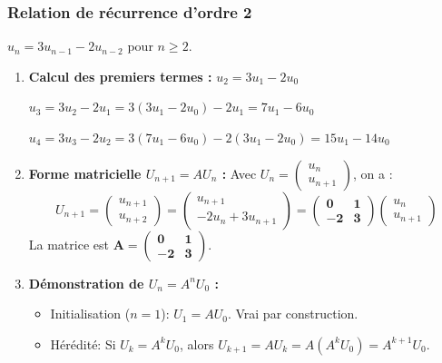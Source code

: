 \documentclass[french]{yLectureNote}
\begin{document}
\subsubsection{Relation de récurrence d'ordre 2}
$u_{n}=3u_{n-1}-2u_{n-2}$ pour $n\ge2$.

\begin{enumerate}
    \item \textbf{Calcul des premiers termes :}
    $u_{2} = 3u_{1} - 2u_{0}$

    $u_{3} = 3u_{2} - 2u_{1} = 3(3u_{1} - 2u_{0}) - 2u_{1} = 7u_{1} - 6u_{0}$

    $u_{4} = 3u_{3} - 2u_{2} = 3(7u_{1} - 6u_{0}) - 2(3u_{1} - 2u_{0}) = 15u_{1} - 14u_{0}$

    \item \textbf{Forme matricielle $U_{n+1}=AU_{n}$ :}
    Avec $U_{n}=\begin{pmatrix}u_{n}\\ u_{n+1}\end{pmatrix}$, on a :
    $$U_{n+1} = \begin{pmatrix} u_{n+1}\\ u_{n+2} \end{pmatrix} = \begin{pmatrix} u_{n+1}\\ -2u_{n}+3u_{n+1} \end{pmatrix} = \mathbf{\begin{pmatrix} 0&1\\ -2&3 \end{pmatrix}} \begin{pmatrix} u_{n}\\ u_{n+1} \end{pmatrix}$$
    La matrice est $\mathbf{A = \begin{pmatrix} 0&1\\ -2&3 \end{pmatrix}}$.

    \item \textbf{Démonstration de $U_{n}=A^{n}U_{0}$ :}
    \begin{itemize}
        \item Initialisation ($n=1$): $U_1 = A U_0$. Vrai par construction.
        \item Hérédité: Si $U_k = A^k U_0$, alors $U_{k+1} = A U_k = A (A^k U_0) = A^{k+1} U_0$.
    \end{itemize}


\end{enumerate}
\end{document}
